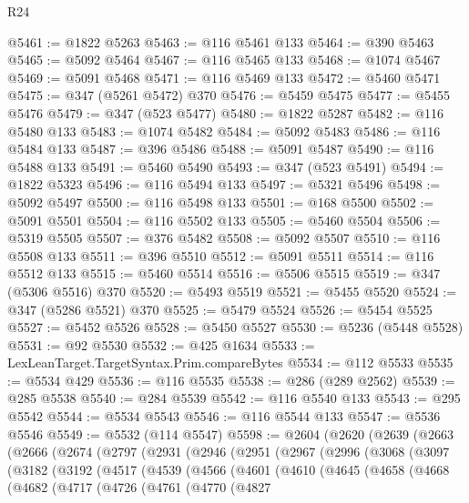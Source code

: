 \begin{lexlean}{R24}
\begin{coremodule}
{{{{{{{{{{{{{{{{{{{{{{{{{{{{{{{{{{{{{{{{{{{{{{{{{{{{{{{{{{{{{{{{{{{{{{{{{{{{{{{{{{{{{{{{{{{{{{{{{{{{{{{{{{{{{{{{{{{{{{{{{{{{{{{{{{{{{{{{{{{{{{{{{{{{{{{{{{{{{{{{{{{{{{{{{{{{{{{{{{{{{{{{{{{{{{{{{{{@5461 := @1822 @5263
@5463 := @116 @5461 @133
@5464 := @390 @5463
@5465 := @5092 @5464
@5467 := @116 @5465 @133
@5468 := @1074 @5467
@5469 := @5091 @5468
@5471 := @116 @5469 @133
@5472 := @5460 @5471
@5475 := @347 (@5261 @5472) @370
@5476 := @5459 @5475
@5477 := @5455 @5476
@5479 := @347 (@523 @5477)
@5480 := @1822 @5287
@5482 := @116 @5480 @133
@5483 := @1074 @5482
@5484 := @5092 @5483
@5486 := @116 @5484 @133
@5487 := @396 @5486
@5488 := @5091 @5487
@5490 := @116 @5488 @133
@5491 := @5460 @5490
@5493 := @347 (@523 @5491)
@5494 := @1822 @5323
@5496 := @116 @5494 @133
@5497 := @5321 @5496
@5498 := @5092 @5497
@5500 := @116 @5498 @133
@5501 := @168 @5500
@5502 := @5091 @5501
@5504 := @116 @5502 @133
@5505 := @5460 @5504
@5506 := @5319 @5505
@5507 := @376 @5482
@5508 := @5092 @5507
@5510 := @116 @5508 @133
@5511 := @396 @5510
@5512 := @5091 @5511
@5514 := @116 @5512 @133
@5515 := @5460 @5514
@5516 := @5506 @5515
@5519 := @347 (@5306 @5516) @370
@5520 := @5493 @5519
@5521 := @5455 @5520
@5524 := @347 (@5286 @5521) @370
@5525 := @5479 @5524
@5526 := @5454 @5525
@5527 := @5452 @5526
@5528 := @5450 @5527
@5530 := @5236 (@5448 @5528)
@5531 := @92 @5530
@5532 := @425 @1634
@5533 := LexLeanTarget.TargetSyntax.Prim.compareBytes
@5534 := @112 @5533
@5535 := @5534 @429
@5536 := @116 @5535
@5538 := @286 (@289 @2562)
@5539 := @285 @5538
@5540 := @284 @5539
@5542 := @116 @5540 @133
@5543 := @295 @5542
@5544 := @5534 @5543
@5546 := @116 @5544 @133
@5547 := @5536 @5546
@5549 := @5532 (@114 @5547)
@5598 := @2604
    (@2620
      (@2639
        (@2663
          (@2666
            (@2674
              (@2797
                (@2931
                  (@2946
                    (@2951
                      (@2967
                        (@2996
                          (@3068
                            (@3097
                              (@3182
                                (@3192
                                  (@4517
                                    (@4539
                                      (@4566
                                        (@4601
                                          (@4610
                                            (@4645
                                              (@4658
                                                (@4668
                                                  (@4682
                                                    (@4717
                                                      (@4726
                                                        (@4761
                                                          (@4770
                                                            (@4827
}}}}}}}}}}}}}}}}}}}}}}}}}}}}}}}}}}}}}}}}}}}}}}}}}}}}}}}}}}}}}}}}}}}}}}}}}}}}}}}}}}}}}}}}}}}}}}}}}}}}}}}}}}}}}}}}}}}}}}}}}}}}}}}}}}}}}}}}}}}}}}}}}}}}}}}}}}}}}}}}}}}}}}}}}}}}}}}}}}}}}}}}}}}}}}}}}}}
\end{coremodule}
\end{lexlean}
